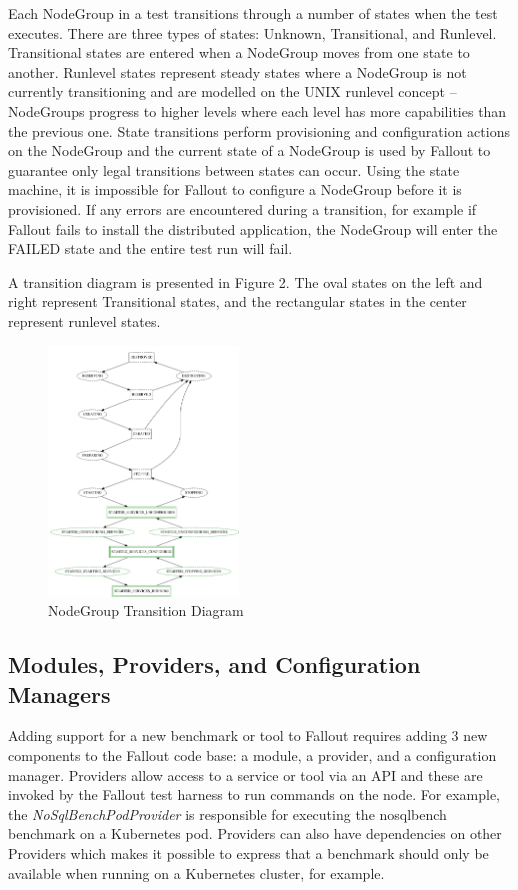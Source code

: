 \documentclass[a4paper,fleqn]{cas-dc}
\begin{document}
Each NodeGroup in a test transitions through a number of states when the test executes. There are
three types of states: Unknown, Transitional, and Runlevel. Transitional states are entered when a
NodeGroup moves from one state to another. Runlevel states represent steady states where a NodeGroup
is not currently transitioning and are modelled on the UNIX runlevel concept -- NodeGroups progress
to higher levels where each level has more capabilities than the previous one. State transitions
perform provisioning and configuration actions on the NodeGroup and the current state of a NodeGroup
is used by Fallout to guarantee only legal transitions between states can occur. Using
the state machine, it is impossible for Fallout to configure a NodeGroup before it is provisioned. If
any errors are encountered during a transition, for example if Fallout fails to install the
distributed application, the NodeGroup will enter the FAILED state and the entire test run will
fail.

A transition diagram is presented in Figure 2. The oval states on the left and right represent
Transitional states, and the rectangular states in the center represent runlevel states.

\begin{figure}
	\includegraphics[width=0.45\textwidth]{node-group-states}
	\caption{NodeGroup Transition Diagram}\label{Figure 2}
\end{figure}


\subsection{Modules, Providers, and Configuration Managers}

Adding support for a new benchmark or tool to Fallout requires adding 3 new components to the
Fallout code base: a module, a provider, and a configuration manager. Providers allow access to a
service or tool via an API and these are invoked by the Fallout test harness to run commands on the
node. For example, the \emph{NoSqlBenchPodProvider} is responsible for executing the nosqlbench
\cite{NOSQLBENCH} benchmark
on a Kubernetes pod. Providers can also have dependencies on other Providers which makes it possible
to express that a benchmark should only be available when running on a Kubernetes cluster, for
example.
\end{document}
